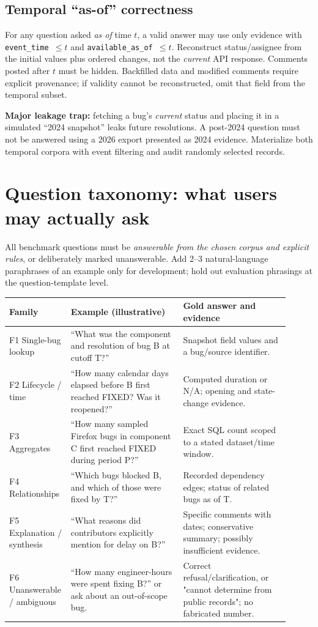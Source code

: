 \documentclass[11pt,a4paper]{article}
\begin{document}
\subsection{Temporal ``as-of'' correctness}
For any question asked \emph{as of} time $t$, a valid answer may use only evidence with \texttt{event\_time $\le t$} and \texttt{available\_as\_of $\le t$}. Reconstruct status/assignee from the initial values plus ordered changes, not the \emph{current} API response. Comments posted after $t$ must be hidden. Backfilled data and modified comments require explicit provenance; if validity cannot be reconstructed, omit that field from the temporal subset.

\begin{warnbox}
\textbf{Major leakage trap:} fetching a bug's \emph{current} status and placing it in a simulated ``2024 snapshot'' leaks future resolutions. A post-2024 question must not be answered using a 2026 export presented as 2024 evidence. Materialize both temporal corpora with event filtering and audit randomly selected records.
\end{warnbox}

\section{Question taxonomy: what users may actually ask}
All benchmark questions must be \emph{answerable from the chosen corpus and explicit rules}, or deliberately marked unanswerable. Add 2--3 natural-language paraphrases of an example only for development; hold out evaluation phrasings at the question-template level.

\begin{longtable}{@{}p{0.15\linewidth}p{0.39\linewidth}p{0.37\linewidth}@{}}\toprule
\textbf{Family}&\textbf{Example (illustrative)}&\textbf{Gold answer and evidence}\\\midrule\endhead
F1 Single-bug lookup&``What was the component and resolution of bug B at cutoff T?''&Snapshot field values and a bug/source identifier.\\
F2 Lifecycle / time&``How many calendar days elapsed before B first reached FIXED? Was it reopened?''&Computed duration or N/A; opening and state-change evidence.\\
F3 Aggregates&``How many sampled Firefox bugs in component C first reached FIXED during period P?''&Exact SQL count scoped to a stated dataset/time window.\\
F4 Relationships&``Which bugs blocked B, and which of those were fixed by T?''&Recorded dependency edges; status of related bugs as of T.\\
F5 Explanation / synthesis&``What reasons did contributors explicitly mention for delay on B?''&Specific comments with dates; conservative summary; possibly insufficient evidence.\\
F6 Unanswerable / ambiguous&``How many engineer-hours were spent fixing B?'' or ask about an out-of-scope bug.&Correct refusal/clarification, or "cannot determine from public records"; no fabricated number.\\\bottomrule
\end{longtable}
\end{document}

